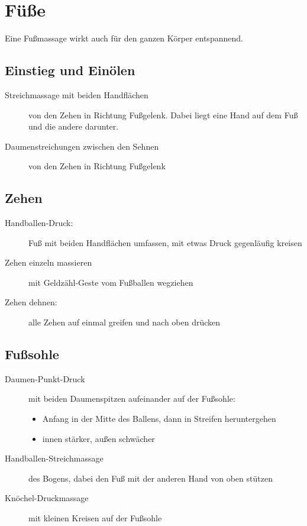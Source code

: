 \section{Füße}

Eine Fußmassage wirkt auch für den ganzen Körper entspannend.

\subsection{Einstieg und Einölen}
\begin{description}
  \item[Streichmassage mit beiden Handflächen] von den Zehen in Richtung Fußgelenk. Dabei liegt eine Hand auf dem Fuß und die andere darunter.
  \item[Daumenstreichungen zwischen den Sehnen] von den Zehen in Richtung Fußgelenk
\end{description}

\subsection{Zehen}
\begin{description}
  \item[Handballen-Druck:] Fuß mit beiden Handflächen umfassen, mit etwas Druck gegenläufig kreisen
  \item[Zehen einzeln massieren] mit Geldzähl-Geste vom Fußballen wegziehen
  \item[Zehen dehnen:] alle Zehen auf einmal greifen und nach oben drücken
\end{description}

\subsection{Fußsohle}
\begin{description}
\item[Daumen-Punkt-Druck] mit beiden Daumenspitzen aufeinander auf der Fußsohle:
  \begin{itemize}
    \item Anfang in der Mitte des Ballens, dann in Streifen heruntergehen
    \item innen stärker, außen schwächer
  \end{itemize}
\item[Handballen-Streichmassage] des Bogens, dabei den Fuß mit der anderen Hand von oben stützen
\item[Knöchel-Druckmassage] mit kleinen Kreisen auf der Fußsohle
\end{description}

